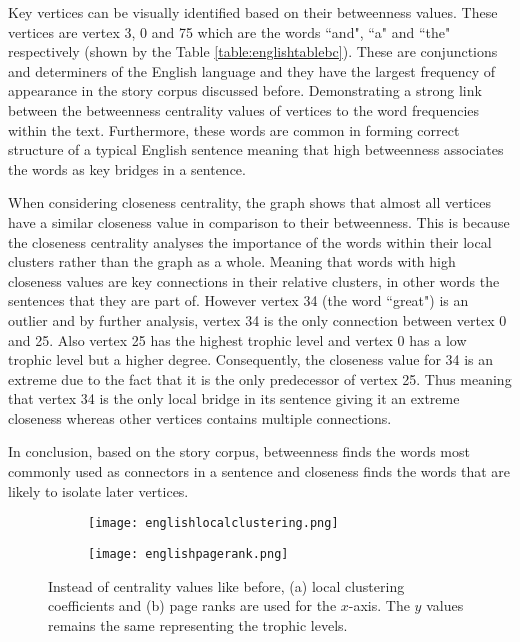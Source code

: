 Key vertices can be visually identified based on their betweenness values. These vertices are vertex 3, 0 and 75 which are the words ``and", ``a" and ``the" respectively (shown by the Table \ref{table:englishtablebc}). These are conjunctions and determiners of the English language and they have the largest frequency of appearance in the story corpus discussed before. Demonstrating a strong link between the betweenness centrality values of vertices to the word frequencies within the text. Furthermore, these words are common in forming correct structure of a typical English sentence meaning that high betweenness associates the words as key bridges in a sentence. 

When considering closeness centrality, the graph shows that almost all vertices have a similar closeness value in comparison to their betweenness. This is because the closeness centrality analyses the importance of the words within their local clusters rather than the graph as a whole. Meaning that words with high closeness values are key connections in their relative clusters, in other words the sentences that they are part of. However vertex 34 (the word ``great") is an outlier and by further analysis, vertex 34 is the only connection between vertex 0 and 25. Also vertex 25 has the highest trophic level and vertex 0 has a low trophic level but a higher degree. Consequently, the closeness value for 34 is an extreme due to the fact that it is the only predecessor of vertex 25. Thus meaning that vertex 34 is the only local bridge in its sentence giving it an extreme closeness whereas other vertices contains multiple connections.

In conclusion, based on the story corpus, betweenness finds the words most commonly used as connectors in a sentence and closeness finds the words that are likely to isolate later vertices.

\begin{figure}[H]
\centering
\begin{subfigure}{.45\textwidth}
	\hspace{-1cm} 
	\texttt{[image: englishlocalclustering.png]}
	\caption{}
	\label{fig:englc}
\end{subfigure}
\hfill
\begin{subfigure}{.45\textwidth}
	\hspace{-1cm} 
	\texttt{[image: englishpagerank.png]}
	\caption{}
	\label{fig:engpr}
\end{subfigure}
\caption{Instead of centrality values like before, (a) local clustering coefficients and (b) page ranks are used for the $x$-axis. The $y$ values remains the same representing the trophic levels.}
\end{figure}

